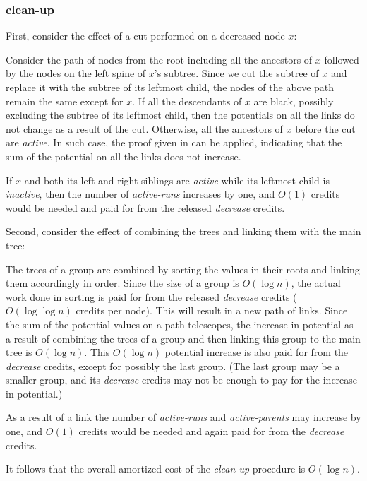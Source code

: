 \subsubsection{clean-up} 

First, consider the effect of a cut performed on a decreased node $x$:

Consider the path of nodes from the root including all the ancestors of $x$ followed by the nodes on the left spine of $x$'s subtree. Since we cut the subtree of $x$ and replace it with the subtree of its leftmost child, the nodes of the above path remain the same except for $x$.
If all the descendants of $x$ are black, possibly excluding the subtree of its leftmost child, then the potentials on all the links do not change as a result of the cut. Otherwise, all the ancestors of $x$ before the cut are {\it active}. 
In such case, the proof given in \cite{elm0}can be applied, indicating that the sum of the potential on all the links does not increase.

If $x$ and both its left and right siblings are {\it active} while its leftmost child is {\it inactive}, then the number of {\it active-runs} increases by one, and $O(1)$ credits would be needed and paid for from the released {\it decrease} credits. 


Second, consider the effect of combining the trees and linking them with the main tree: 

The trees of a group are combined by sorting the values in their roots and linking them accordingly in order.  Since the size of a group is $O(\log{n})$, the actual work done in sorting is paid for from the released {\it decrease} credits ($O(\log\log{n})$ credits per node). This will result in a new path of links. Since the sum of the potential values on a path telescopes, the increase in potential as a result of combining the trees of a group and then linking this group to the main tree is $O(\log{n})$. This $O(\log{n})$ potential increase is also paid for from the {\it decrease} credits, except for possibly the last group. (The last group may be a smaller group, and its {\it decrease} credits may not be enough to pay for the increase in potential.) 

As a result of a link the number of {\it active-runs} and {\it active-parents} may increase by one, and $O(1)$ credits would be needed and again paid for from the {\it decrease} credits.  

It follows that the overall amortized cost of the {\it clean-up} procedure is $O(\log{n})$.


